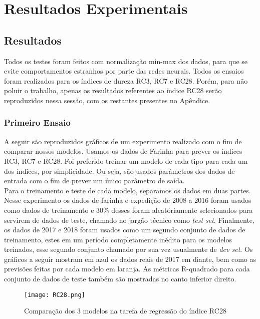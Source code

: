 \chapter{Resultados Experimentais }
\label{cap:resultados}

\section{Resultados}


Todos os testes foram feitos com normalização min-max dos dados, para que se
evite comportamentos estranhos por parte das redes neurais. Todos os ensaios
foram realizados para os índices de dureza RC3, RC7 e RC28. Porém, para não
poluir o trabalho, apenas os
resultados referentes ao índice RC28 serão reproduzidos nessa sessão, com os
restantes presentes no Apêndice.\\


\subsection{Primeiro Ensaio}
A seguir são reproduzidos gráficos de um experimento realizado com o fim de
comparar nossos modelos. Usamos os dados de Farinha para prever os índices RC3,
RC7 e RC28. Foi preferido treinar um modelo de cada tipo para cada um dos
índices, por simplicidade. Ou seja, são usados parâmetros dos dados de entrada
com o fim de prever um único parâmetro de saída. \\ 
Para o treinamento e teste de cada modelo, separamos os dados em duas partes. Nesse experimento os dados de farinha e expedição de 2008 a 2016 foram usados como dados de treinamento e 30\% desses foram aleatóriamente selecionados para servirem de dados de teste, chamado no jargão técnico como \textit{test set}. Finalmente, os dados de 2017 e 2018 foram usados como um segundo conjunto de dados de treinamento, estes em um período completamente inédito para os modelos treinados, esse segundo conjunto chamado por sua vez usualmente de \textit{dev set}. Os gráficos a seguir mostram em azul os dados reais de 2017 em diante, bem como as previsões feitas por cada modelo em laranja. As métricas R-quadrado para cada conjunto de dados de teste também são mostradas no canto inferior direito.

\begin{figure}[H]
\centering
\texttt{[image: RC28.png]}
\caption{Comparação dos 3 modelos na tarefa de regressão do índice RC28}
\end{figure}

